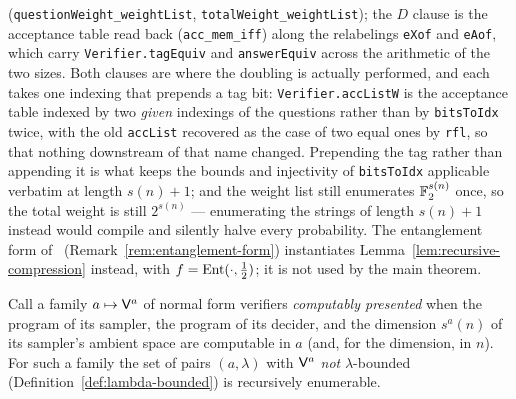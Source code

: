 \begin{remark}
(\texttt{questionWeight\_weightList}, \texttt{totalWeight\_weightList}); the $D$ clause is the
acceptance table read back (\texttt{acc\_mem\_iff}) along the relabelings \texttt{eXof} and
\texttt{eAof}, which carry \texttt{Verifier.tagEquiv} and \texttt{answerEquiv} across the
arithmetic of the two sizes. Both clauses are where the doubling is actually performed, and
each takes one indexing that prepends a tag bit: \texttt{Verifier.accListW} is the acceptance
table indexed by two \emph{given} indexings of the questions rather than by
\texttt{bitsToIdx} twice, with the old \texttt{accList} recovered as the case of two equal
ones by \texttt{rfl}, so that nothing downstream of that name changed. Prepending the tag
rather than appending it is what keeps the bounds and injectivity of \texttt{bitsToIdx}
applicable verbatim at length $s(n) + 1$; and the weight list still enumerates $\mathbb{F}_2^{s(n)}$
once, so the total weight is still $2^{s(n)}$ --- enumerating the strings of length
$s(n) + 1$ instead would compile and silently halve every probability. The entanglement form
of~\cite{JNVWY20}
(Remark~\ref{rem:entanglement-form}) instantiates Lemma~\ref{lem:recursive-compression}
instead, with $f = \mathrm{Ent}(\cdot, \frac12)$; it is not used by the main theorem.
\end{remark}

\begin{lemma}
\label{lem:bounded-violation-re}
\leanok
Call a family $a \mapsto \mathsf{V}^a$ of normal form verifiers \emph{computably presented}
when the program of its sampler, the program of its decider, and the dimension $s^a(n)$ of
its sampler's ambient space are computable in $a$ (and, for the dimension, in $n$). For such
a family the set of pairs $(a, \lambda)$ with $\mathsf{V}^a$ \emph{not} $\lambda$-bounded
(Definition~\ref{def:lambda-bounded}) is recursively enumerable.
\end{lemma}

